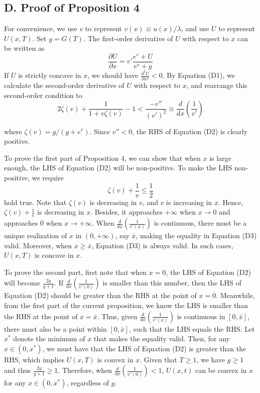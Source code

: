 \documentclass[
  12pt,
]{article}
\begin{document}
\hypertarget{d.-proof-of-proposition-4}{%
\subsection*{D. Proof of Proposition
4}\label{d.-proof-of-proposition-4}}

For convenience, we use \(v\) to represent \(v(x)\equiv u(x)/\lambda\),
and use \(U\) to represent \(U(x,T)\). Set \(g= G(T)\). The first-order
derivative of \(U\) with respect to \(x\) can be written as\[\tag{D1}
\frac{\partial U}{\partial x}=v'\frac{e^v+U}{e^v+g}
\]If \(U\) is strictly concave in \(x\), we should have
\(\frac{\partial^2 U}{\partial x^2}<0\). By Equation (D1), we calculate
the second-order derivative of \(U\) with respect to \(x\), and
rearrange this second-order condition to\[\tag{D2}
2\zeta(v)+\frac{1}{1+v\zeta(v)}-1<\frac{-v''}{(v')^2}\equiv\frac{d}{dx}\left(\frac{1}{v'}\right)
\]

where \(\zeta(v)=g/(g+e^v)\). Since \(v''<0\), the RHS of Equation (D2)
is clearly positive.

To prove the first part of Proposition 4, we can show that when \(x\) is
large enough, the LHS of Equation (D2) will be non-positive. To make the
LHS non-positive, we require\[\tag{D3}
\zeta(v)+\frac{1}{v}\leq\frac{1}{2}
\]hold true. Note that \(\zeta(v)\) is decreasing in \(v\), and \(v\) is
increasing in \(x\). Hence, \(\zeta(v)+\frac{1}{v}\) is decreasing in
\(x\). Besides, it approaches \(+\infty\) when \(x\rightarrow0\) and
approaches 0 when \(x\rightarrow +\infty\). When
\(\frac{d}{dx}\left(\frac{1}{v'(x)}\right)\) is continuous, there must
be a unique realization of \(x\) in \((0,+\infty)\), say \(\bar{x}\),
making the equality in Equation (D3) valid. Moreover, when
\(x\geq\bar{x}\), Equation (D3) is always valid. In such cases,
\(U(x,T)\) is concave in \(x\).

To prove the second part, first note that when \(x=0\), the LHS of
Equation (D2) will become \(\frac{2g}{g+1}\). If
\(\frac{d}{dx}\left(\frac{1}{v'(0)}\right)\) is smaller than this
number, then the LHS of Equation (D2) should be greater than the RHS at
the point of \(x=0\). Meanwhile, from the first part of the current
proposition, we know the LHS is smaller than the RHS at the point of
\(x=\bar{x}\). Thus, given \(\frac{d}{dx}\left(\frac{1}{v'(x)}\right)\)
is continuous in \([0,\bar{x}]\), there must also be a point within
\([0,\bar{x}]\), such that the LHS equals the RHS. Let \(x^*\) denote
the minimum of \(x\) that makes the equality valid. Then, for any
\(x\in(0,x^*)\), we must have that the LHS of Equation (D2) is greater
than the RHS, which implies \(U(x,T)\) is convex in \(x\). Given that
\(T\geq1\), we have \(g\geq1\) and thus \(\frac{2g}{g+1}\geq 1\).
Therefore, when \(\frac{d}{dx}\left(\frac{1}{v'(0)}\right)<1\),
\(U(x,t)\) can be convex in \(x\) for any \(x\in(0,x^{*})\), regardless
of \(g\).
\end{document}
